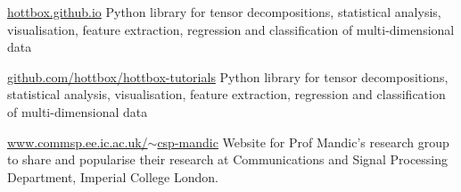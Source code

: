 

\begin{cventries}

            {\href{https://hottbox.github.io}{hottbox.github.io}} %
            { %
                Python library for tensor decompositions, statistical analysis, visualisation, feature extraction, regression and classification of multi-dimensional data
            }

            {\href{https://github.com/hottbox/hottbox-tutorials}{github.com/hottbox/hottbox-tutorials}} %
            { %
                Python library for tensor decompositions, statistical analysis, visualisation, feature extraction, regression and classification of multi-dimensional data
            }

            {\href{http://www.commsp.ee.ic.ac.uk/~csp-mandic/}{www.commsp.ee.ic.ac.uk/$\sim$csp-mandic}} %
            { %
                Website for Prof Mandic's research group to share and popularise their research at Communications and Signal Processing Department, Imperial College London.
            }

\end{cventries}
